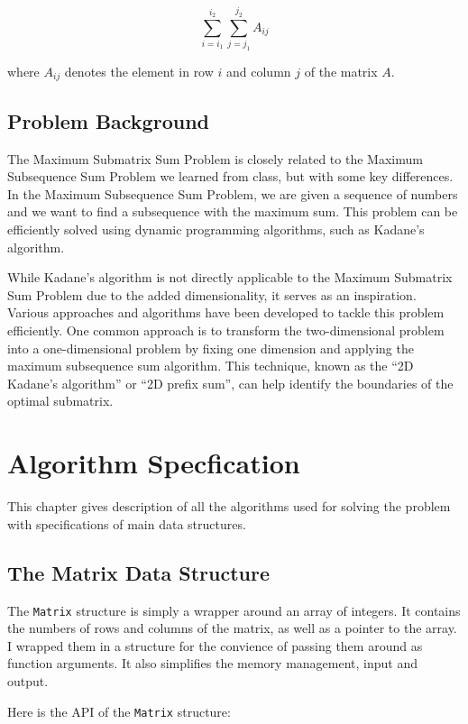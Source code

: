 \documentclass[a4paper,oneside]{book}
\begin{document}
\[\sum_{i = i_1}^{i_2} \sum_{j = j_1}^{j_2} A_{ij}\]

where $A_{ij}$ denotes the element in row $i$ and column $j$ of the matrix $A$.

\section{Problem Background}

The Maximum Submatrix Sum Problem is closely related to the Maximum Subsequence
Sum Problem we learned from class, but with some key differences. In the
Maximum Subsequence Sum Problem, we are given a sequence of numbers and we want
to find a subsequence with the maximum sum. This problem can be efficiently
solved using dynamic programming algorithms, such as Kadane's algorithm.

While Kadane's algorithm is not directly applicable to the Maximum Submatrix
Sum Problem due to the added dimensionality, it serves as an inspiration.
Various approaches and algorithms have been developed to tackle this problem
efficiently. One common approach is to transform the two-dimensional problem
into a one-dimensional problem by fixing one dimension and applying the maximum
subsequence sum algorithm. This technique, known as the ``2D Kadane's
algorithm'' or ``2D prefix sum'', can help identify the boundaries of the
optimal submatrix.

\chapter{Algorithm Specfication}

This chapter gives description of all the algorithms used for solving the
problem with specifications of main data structures.

\section{The Matrix Data Structure}

The \verb|Matrix| structure is simply a wrapper around an array of integers. It
contains the numbers of rows and columns of the matrix, as well as a pointer to
the array. I wrapped them in a structure for the convience of passing them
around as function arguments. It also simplifies the memory management, input
and output.

Here is the API of the \verb|Matrix| structure:
\end{document}
